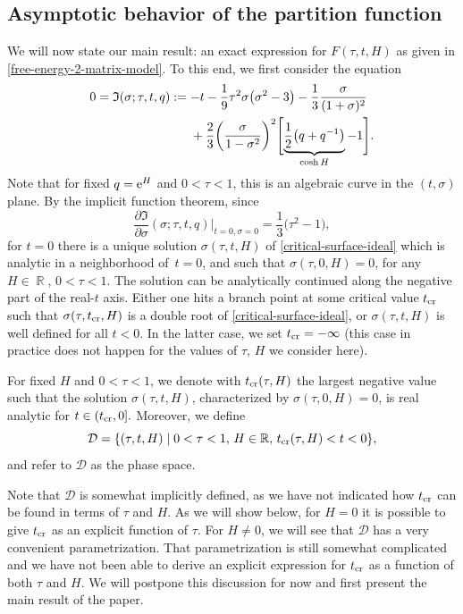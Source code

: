 \documentclass[10pt,a4paper]{amsart}
\DeclareMathOperator{\RR}{\mathbb{R}}
\numberwithin{equation}{section}
\begin{document}
\subsection{Asymptotic behavior of the partition function}
We will now state our main result: an exact expression for $F(\tau,t,H)$ as given in \eqref{free-energy-2-matrix-model}.
To this end, we first consider the equation
 \begin{align}
 0 = \mathfrak{I}(\sigma;\tau,t,q) :={}& {-}t -\frac{1}{9}\tau^2\sigma \bigl(\sigma^2 - 3\bigr) -\frac{1}{3}\frac{\sigma}{(1+\sigma)^2} \nonumber\\
 \hphantom{0 = \mathfrak{I}(\sigma;\tau,t,q) :=}{}
 &{} + \frac{2}{3}\biggl(\frac{\sigma}{1-\sigma^2}\biggr)^2\Biggl[\underbrace{\frac{1}{2}\bigl(q+q^{-1}\bigr)}_{\cosh H} -1\Biggr].\label{critical-surface-ideal}
 \end{align}
Note that for fixed $q={\rm e}^{H}$ and $0< \tau <1$, this is an algebraic curve in the $(t,\sigma)$ plane. By the implicit function theorem, since
 \begin{equation*}
 \frac{\partial \mathfrak{I}}{\partial \sigma}(\sigma;\tau,t,q)\big|_{t=0,\sigma=0} = \frac{1}{3}\bigl(\tau^2-1\bigr),
 \end{equation*}
for $t=0$ there is a unique solution $\sigma(\tau,t, H)$ of \eqref{critical-surface-ideal} which is analytic in a neighborhood of~${t=0}$, and such that $\sigma(\tau,0,H)=0$, for any $H\in \RR$, $0<\tau<1$. The solution can be analytically continued along the negative part of the real-$t$ axis. Either one hits a branch point at some critical value $t_{\rm cr}$ such that $\sigma(\tau,t_{\rm cr},H)$ is a double root of \eqref{critical-surface-ideal}, or $\sigma(\tau,t,H)$ is well defined for all $t<0$. In the latter case, we set $t_{\rm cr}=-\infty$ (this case in practice does not happen for the values of $\tau$, $H$ we consider here).
\begin{Definition} \label{def:sigmaDtcrx}
For fixed $H$ and $0<\tau <1$, we denote with $t_{\rm cr}(\tau,H)$ the largest negative value such that the solution $\sigma(\tau,t,H)$, characterized by $\sigma(\tau,0, H)=0$, is real analytic for $t\in (t_{\rm cr},0].$ Moreover, we define
\[
\mathcal D=\{(\tau,t,H) \mid 0<\tau<1,\, H \in \mathbb{R},\, t_{\rm cr}(\tau,H)< t <0\},
\]
and refer to $\mathcal{D}$ as the phase space.
\end{Definition}
Note that $\mathcal{D}$ is somewhat implicitly defined, as we have not indicated how $t_{\rm cr}$ can be found in terms of $\tau$ and $H$. As we will show below, for $H=0$ it is possible to give $t_{\rm cr}$ as an explicit function of $\tau$. For $H\neq 0$, we will see that $\mathcal D$ has a very convenient parametrization. That parametrization is still somewhat complicated and we have not been able to derive an explicit expression for $t_{\rm cr}$ as a function of both $\tau$ and $H$. We will postpone this discussion for now and first present the main result of the paper.
\end{document}
